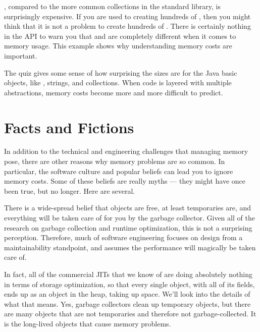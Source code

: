 , compared to the more common
collections in the standard library, is surprisingly expensive. If you are used to creating
hundreds of , then you might think that it is not a problem to
create hundreds of . There is certainly nothing in
the API to warn you that  and  are
completely different when it comes to memory usage. This example shows why
understanding memory costs are important.

The quiz gives some sense of how surprising the sizes are for the Java basic
objects, like , strings, and collections. When code is layered
with multiple abstractions, memory costs become more and more difficult to
predict.

\section{Facts and Fictions}

In addition to the technical and engineering challenges that managing memory
pose, there are other reasons why memory problems are so common. In particular,
the software culture and popular beliefs can lead you to ignore memory costs. 
Some of these beliefs are really myths --- they might have once been true, but
no longer.  Here are several.


There is a wide-spread belief that objects are free, at least temporaries are,
and everything will be taken care of for you by the garbage collector.
Given all of the research on garbage collection and runtime optimization, this
is not a surprising perception. Therefore, much of software engineering focuses on
design from a maintainability standpoint, and assumes the performance will
magically be taken care of.

In fact, all of the commercial JITs that
we know of are doing absolutely nothing in terms of storage optimization, so
that every single object, with all of its fields, ends up as an object in the
heap, taking up space.  We'll look into the details of what that means.
Yes, garbage collectors clean up temporary objects, but there are many
objects that are not temporaries and therefore not garbage-collected. It is the
long-lived objects that cause memory problems.


